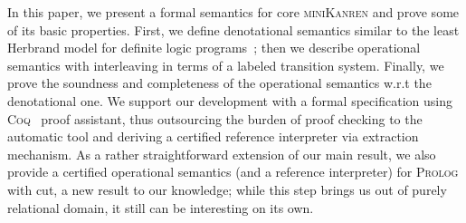In this paper, we present a formal semantics for core \textsc{miniKanren} and prove some of its basic properties. First,
we define denotational semantics similar to the least Herbrand model for definite logic programs~\cite{LHM}; then
we describe operational semantics with interleaving in terms of a labeled transition system. Finally, we prove the soundness and
completeness of the operational semantics w.r.t the denotational one. We support our development with a formal specification
using \textsc{Coq}~\cite{Coq} proof assistant, thus outsourcing the burden of proof checking to the automatic tool and
deriving a certified reference interpreter via extraction mechanism. As a rather straightforward extension of our
main result, we also provide a certified operational semantics (and a reference interpreter) for \textsc{Prolog} with cut, a new result
to our knowledge; while this step brings us out of purely relational domain, it still can be interesting on its own.

\begin{comment}
The paper organized as follows. In Section~\ref{language} we give the syntax of the language, describe its semantics
informally and discuss some examples. Section~\ref{denotational} contains the description of the denotational semantics for
the language, and Section~\ref{operational}~--- the operational semantics. In Section~\ref{equivalence} we overview the
certified proof for soundness and completeness of operational semantics. The final section concludes.
\end{comment}
